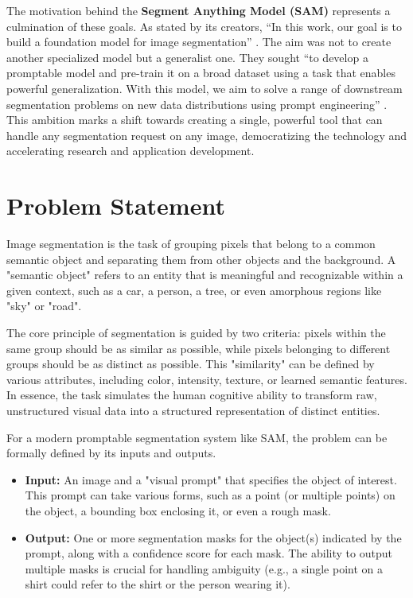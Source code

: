The motivation behind the \textbf{Segment Anything Model (SAM)} represents a culmination of these goals. As stated by its creators, ``In this work, our goal is to build a foundation model for image segmentation'' \cite{kirillov2023segment}. The aim was not to create another specialized model but a generalist one. They sought ``to develop a promptable model and pre-train it on a broad dataset using a task that enables powerful generalization. With this model, we aim to solve a range of downstream segmentation problems on new data distributions using prompt engineering'' \cite{kirillov2023segment}. This ambition marks a shift towards creating a single, powerful tool that can handle any segmentation request on any image, democratizing the technology and accelerating research and application development.

\section{Problem Statement}
Image segmentation is the task of grouping pixels that belong to a common semantic object and separating them from other objects and the background. A "semantic object" refers to an entity that is meaningful and recognizable within a given context, such as a car, a person, a tree, or even amorphous regions like "sky" or "road".

The core principle of segmentation is guided by two criteria: pixels within the same group should be as similar as possible, while pixels belonging to different groups should be as distinct as possible. This "similarity" can be defined by various attributes, including color, intensity, texture, or learned semantic features. In essence, the task simulates the human cognitive ability to transform raw, unstructured visual data into a structured representation of distinct entities.

For a modern promptable segmentation system like SAM, the problem can be formally defined by its inputs and outputs.
\begin{itemize}
	\item \textbf{Input:} An image and a "visual prompt" that specifies the object of interest. This prompt can take various forms, such as a point (or multiple points) on the object, a bounding box enclosing it, or even a rough mask.
	\item \textbf{Output:} One or more segmentation masks for the object(s) indicated by the prompt, along with a confidence score for each mask. The ability to output multiple masks is crucial for handling ambiguity (e.g., a single point on a shirt could refer to the shirt or the person wearing it).
\end{itemize}

